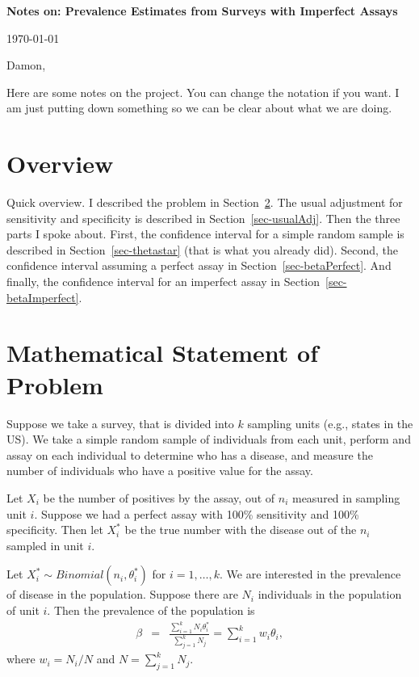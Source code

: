 \documentclass{article}
\begin{document}
{\bf \large Notes on: Prevalence Estimates from Surveys with Imperfect Assays}

\today



Damon,

Here are some notes on the project. You can change the notation if you want. I am just putting down something so we can be clear about what we are doing.

\section{Overview}

Quick overview. I described the problem in Section~\ref{sec-math}. The usual adjustment for sensitivity and specificity is described in Section~\ref{sec-usualAdj}. Then the three parts I spoke about. First, the confidence interval for a simple random sample is described in Section~\ref{sec-thetastar} (that is what you already did). Second, the confidence interval assuming a perfect assay in Section~\ref{sec-betaPerfect}. And finally, the
confidence interval for an imperfect assay in Section~\ref{sec-betaImperfect}.


\section{Mathematical Statement of Problem}
\label{sec-math}

Suppose we take a survey, that is divided into $k$ sampling units (e.g., states in the US).
We take a simple random sample of individuals from each unit, perform and assay on each individual to determine who has a disease, and measure the number of individuals who have a positive value for the assay.

Let $X_i$ be the number of positives by the assay, out of $n_i$ measured in sampling unit $i$.
Suppose we had a perfect assay with 100\% sensitivity and 100\% specificity. Then let $X_i^*$ be the true number with the disease out of the $n_i$ sampled in unit $i$.

Let $X_i^* \sim Binomial(n_i, \theta_i^*)$ for $i=1,\ldots,k$. We are interested in the prevalence of disease in the population. Suppose there are $N_i$ individuals in the population of unit $i$. Then the prevalence of the population is
\begin{eqnarray*}
\beta & = & \frac{ \sum_{i=1}^{k} N_i \theta_i^* }{ \sum_{j=1}^{k} N_j }  =  \sum_{i=1}^{k} w_i \theta_i,
\end{eqnarray*}
where $w_i = N_i/N$ and $N=\sum_{j=1}^{k} N_j$.
\end{document}
